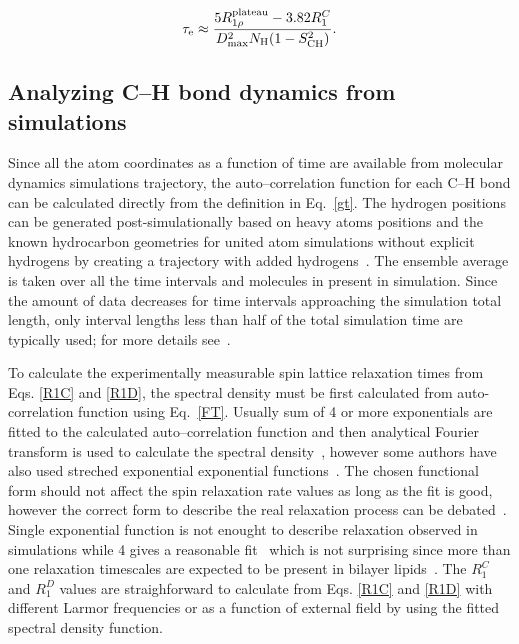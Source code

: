 \documentclass[aps,prl,superscriptaddress,twocolumn]{revtex4}
\begin{document}
\begin{equation}\label{ECT}
\tau_{\rm{e}}\approx\frac{5R_{1\rho}^{\rm{plateau}}-3.82R_1^C}{D_{\rm{max}}^2N_{\rm{H}}(1-S_{\rm{CH}}^2)}.
\end{equation} 


\subsection{Analyzing C--H bond dynamics from simulations}


Since all the atom coordinates as a function of time are available from molecular dynamics simulations trajectory,
the auto--correlation function for each C--H bond can be calculated directly from the definition in Eq.~\ref{gt}.
The hydrogen positions can be generated post-simulationally based on heavy atoms 
positions and the known hydrocarbon geometries for united atom simulations without explicit hydrogens 
by creating a trajectory with added hydrogens~\cite{lindahl01,wohlert06,ollila07a,ferreira15}. 
The ensemble average is taken over all the time intervals and molecules 
in present in simulation. Since the amount of data decreases for time intervals approaching the simulation total length,
only interval lengths less than half of the total simulation time are typically used; for more details see~\cite{gromacsMANUAL}.

To calculate the experimentally measurable spin lattice relaxation times from Eqs. \ref{R1C} and \ref{R1D}, 
the spectral density must be first calculated from auto-correlation function using Eq.~\ref{FT}. 
Usually sum of 4 or more exponentials are fitted to the calculated auto--correlation function and then 
analytical Fourier transform is used to calculate the spectral 
density~\cite{pastor88,venable93,pastor02,eldho03,ollila07a,ferreira15},
however some authors have also used streched exponential exponential functions~\cite{lindahl01,wohlert06}.
The chosen functional form should not affect the spin relaxation rate values as long as the fit is good, however 
the correct form to describe the real relaxation process can be debated~\cite{leftin11,wohlert06,edholm08,klauda08a,klauda08c}. 
Single exponential function is not enought to describe relaxation observed in simulations while 4 gives a reasonable 
fit~\cite{eldho03} which is not surprising since more than one relaxation timescales are expected to be present in bilayer
lipids~\cite{pastor88,venable93,pastor02,leftin11}. The $R_{1}^{C}$ and $R_{1}^{D}$ values are straighforward to
calculate from Eqs. \ref{R1C} and \ref{R1D} with different Larmor frequencies or as a function of external
field by using the fitted spectral density function.
\end{document}
